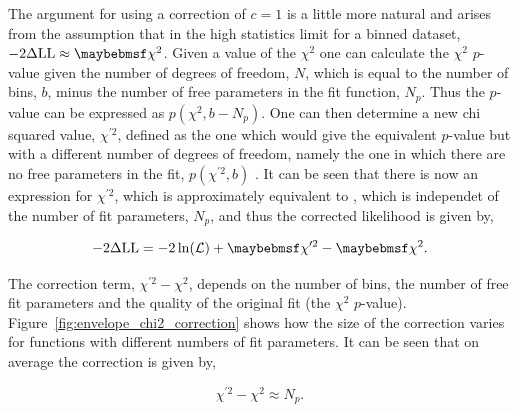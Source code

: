 The argument for using a correction of $c=1$ is a little more natural and arises from the assumption that in the high statistics limit for a binned dataset, $\NLL\approx\chi^{2}$. Given a value of the $\chi^{2}$ one can calculate the $\chi^{2}$ $p$-value given the number of degrees of freedom, $N$, which is equal to the number of bins, $b$, minus the number of free parameters in the fit function, $N_{p}$. Thus the $p$-value can be expressed as $p(\chi^{2},b-N_{p})$. One can then determine a new chi squared value, $\chi^{\prime 2}$, defined as the one which would give the equivalent $p$-value but with a different number of degrees of freedom, namely the one in which there are no free parameters in the fit, $p(\chi^{\prime 2},b)$ . It can be seen that there is now an expression for $\chi^{\prime 2}$, which is approximately equivalent to \NLL, which is independet of the number of fit parameters, $N_{p}$, and thus the corrected likelihood is given by,

\begin{equation}
  \NLL = -2\ln(\mathcal{L}) + \chi^{\prime 2} - \chi^{2}.
\end{equation}

The correction term, $\chi^{\prime 2} -\chi^{2}$, depends on the number of bins, the number of free fit parameters and the quality of the original fit (the $\chi^{2}$ $p$-value). Figure~\ref{fig:envelope_chi2_correction} shows how the size of the correction varies for functions with different numbers of fit parameters. It can be seen that on average the correction is given by,

\begin{equation}
  \chi^{\prime 2} - \chi^{2} \approx N_{p}.
\end{equation}

